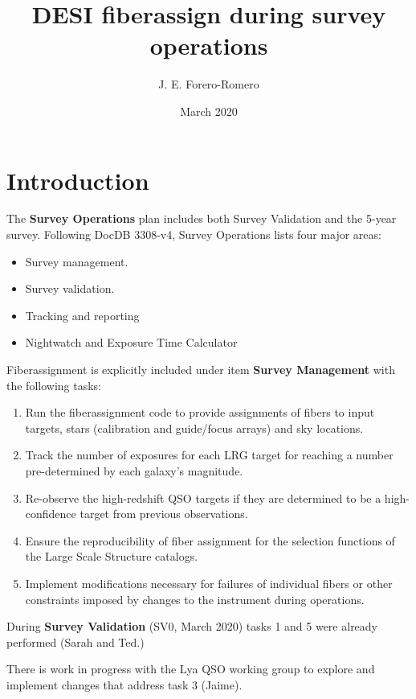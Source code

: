 \documentclass{article}
\title{DESI fiberassign during survey operations}
\author{J. E. Forero-Romero}
\date{March 2020}
\begin{document}
\maketitle

\section{Introduction}


The \textbf{Survey Operations} plan includes both Survey Validation
and the 5-year survey.  Following DocDB 3308-v4, Survey Operations
lists four major areas:

\begin{itemize}
    \item Survey management.
    \item Survey validation.
    \item Tracking and reporting
    \item Nightwatch and Exposure Time Calculator
\end{itemize}

Fiberassignment is explicitly included under item \textbf{Survey Management}
with the following tasks:

\begin{enumerate}
\item Run the fiberassignment code to provide assignments of fibers to
  input targets, stars (calibration and guide/focus arrays) and sky
  locations. 

\item Track the number of exposures for each LRG target for
  reaching a number pre-determined by each galaxy’s magnitude. 

\item Re-observe the high-redshift QSO targets if they are
  determined to be a high-confidence target from previous observations.

\item Ensure the reproducibility of fiber assignment for the
  selection functions of the Large Scale Structure catalogs.

\item Implement modifications necessary for failures of individual
  fibers or other constraints imposed by changes to the instrument
  during operations. 
\end{enumerate}


During \textbf{Survey Validation} (SV0, March 2020) tasks 1 and 5 were 
already performed (Sarah and Ted.)

There is work in progress with the Lya QSO working group to explore
and implement changes that address task 3 (Jaime).
\end{document}
